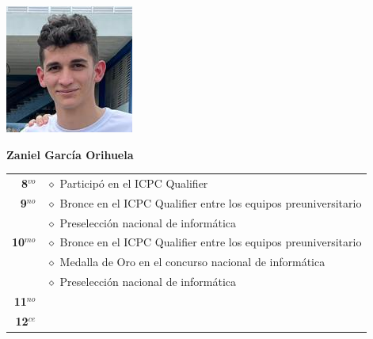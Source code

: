 \begin{minipage}{0.2\textwidth}
	\includegraphics[width=\linewidth]{img/concursantes/zaniel.png} %
\end{minipage}
\hfill
\begin{minipage}{0.7\textwidth}
	\textbf{Zaniel García Orihuela}
	
	\vspace*{0.1in}
	\begin{tabular}{rl}
		
		\textbf{8$^{vo}$} 
		& $\diamond$ Participó en el ICPC Qualifier \\
		
		\textbf{9$^{no}$} 
		& $\diamond$ Bronce en el ICPC Qualifier entre los equipos preuniversitario  \\
		& $\diamond$ Preselección nacional de informática  \\
		
		\textbf{10$^{mo}$} 
		& $\diamond$ Bronce en el ICPC Qualifier entre los equipos preuniversitario  \\
		& $\diamond$ Medalla de Oro en el concurso nacional de informática\\
		& $\diamond$ Preselección nacional de informática  \\
		
		\textbf{11$^{no}$} & \\
	
		\textbf{12$^{ce}$} &   \\
		
	\end{tabular}
\end{minipage}

